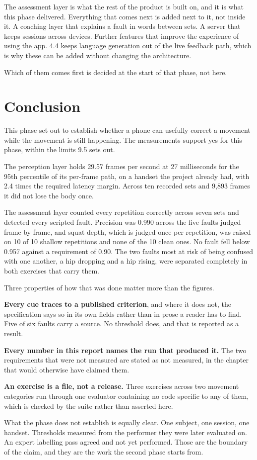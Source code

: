 The assessment layer is what the rest of the product is built on, and it is what this phase delivered. Everything that comes next is added next to it, not inside it. A coaching layer that explains a fault in words between sets. A server that keeps sessions across devices. Further features that improve the experience of using the app. 4.4 keeps language generation out of the live feedback path, which is why these can be added without changing the architecture.

Which of them comes first is decided at the start of that phase, not here.

\section{Conclusion}
\label{sec:11.6}

This phase set out to establish whether a phone can usefully correct a movement while the movement is still happening. The measurements support yes for this phase, within the limits 9.5 sets out.

The perception layer holds 29.57 frames per second at 27 milliseconds for the 95th percentile of its per-frame path, on a handset the project already had, with 2.4 times the required latency margin. Across ten recorded sets and 9,893 frames it did not lose the body once.

The assessment layer counted every repetition correctly across seven sets and detected every scripted fault. Precision was 0.990 across the five faults judged frame by frame, and squat depth, which is judged once per repetition, was raised on 10 of 10 shallow repetitions and none of the 10 clean ones. No fault fell below 0.957 against a requirement of 0.90. The two faults most at risk of being confused with one another, a hip dropping and a hip rising, were separated completely in both exercises that carry them.

Three properties of how that was done matter more than the figures.

\textbf{Every cue traces to a published criterion}, and where it does not, the specification says so in its own fields rather than in prose a reader has to find. Five of six faults carry a source. No threshold does, and that is reported as a result.

\textbf{Every number in this report names the run that produced it.} The two requirements that were not measured are stated as not measured, in the chapter that would otherwise have claimed them.

\textbf{An exercise is a file, not a release.} Three exercises across two movement categories run through one evaluator containing no code specific to any of them, which is checked by the suite rather than asserted here.

What the phase does not establish is equally clear. One subject, one session, one handset. Thresholds measured from the performer they were later evaluated on. An expert labelling pass agreed and not yet performed. Those are the boundary of the claim, and they are the work the second phase starts from.
